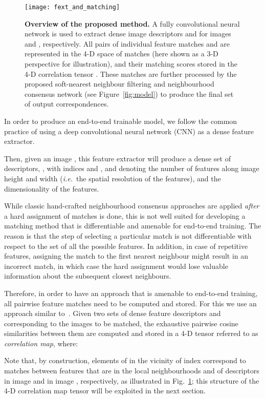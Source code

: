 \documentclass{article}
\begin{document}
\begin{figure}[t]
  \centering
    \texttt{[image: fext\_and\_matching]}
    \caption{\small \textbf{Overview of the proposed method.} A fully convolutional neural network is used to extract dense image descriptors  and  for images  and , respectively. All pairs of individual feature matches  and  are represented in the 4-D space of matches  (here shown as a 3-D perspective for illustration), and their matching scores stored in the 4-D correlation tensor . These matches are further processed by the proposed soft-nearest neighbour filtering and neighbourhood consensus network (see Figure~\ref{fig:model}) to produce the final set of output correspondences.\label{fig:fext_and_matching}}
\end{figure}


In order to produce an end-to-end trainable model, we follow the common practice of using a deep convolutional neural network (CNN)
as a dense feature extractor.

Then, given an image , this feature extractor will produce a dense set of descriptors, , 
with indices  and , and  denoting the number of features along image height and width 
(\emph{i.e.}\ the spatial resolution of the features), and  the dimensionality of the features.

While classic hand-crafted neighbourhood consensus approaches are applied \emph{after} a hard assignment of matches is done, this is not well suited for developing a matching method that is differentiable and amenable for end-to-end training. The reason is that the step of selecting a particular match 
is not differentiable with respect to the set of all the possible features. In addition, in case of repetitive features, assigning the match to the first nearest neighbour might result in an incorrect match, in which case the hard assignment would lose valuable information about the subsequent closest neighbours.


Therefore, in order to have an approach that is amenable to end-to-end training, all pairwise feature matches need to be computed and stored. For this we use an approach similar to~\cite{Rocco17}. Given two sets of dense feature descriptors  and  corresponding to the images to be matched, the exhaustive pairwise cosine similarities between them are computed and stored in a 4-D tensor  referred to as \emph{correlation map}, where:

Note that, by construction, elements of  in the vicinity of index  correspond to matches between features that are in the local neighbourhoods  and  of descriptors  in image  and  in image , respectively, as illustrated in Fig.~\ref{fig:fext_and_matching}; this structure of the 4-D correlation map tensor  will be exploited in the next section.
\end{document}
